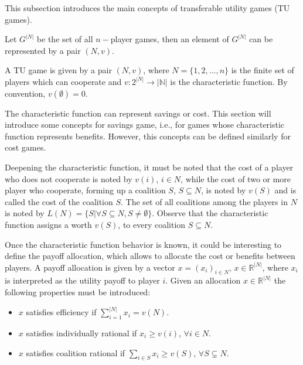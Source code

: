 This subsection introduces the main concepts of transferable utility games (TU games).

Let $G^{|N|}$ be the set of all $n-$player games, then an element of $G^{|N|}$ can be represented by a pair $(N,v)$. 


\begin{definition}
	A TU game is given by a pair $(N,v)$, where $N=\{1,2, \dots, n\}$ is the finite set of players which can cooperate and $v:2^{|N|} \rightarrow \mathbb{|N|}$ is the characteristic function. By convention, $v(\emptyset) = 0$.
\end{definition}
The characteristic function can represent savings or cost. This section will introduce some concepts for savings game, i.e., for games whose characteristic function represents benefits. However, this concepts can be defined similarly for cost games.

Deepening the characteristic function, it must be noted that the cost of a player who does not cooperate is noted by $v(i)$, $i \in N$, while the cost of two or more player who cooperate, forming up a coalition $S$, $S \subseteq N$, is noted by $v(S)$ and is called the cost of the coalition $S$. The set of all coalitions among the players in $N$ is noted by $L(N) = \{ S | \forall S \subseteq N, S \ne \emptyset \} $. Observe that the characteristic function assigns a worth $v(S)$, to every coalition $S \subseteq N$.


Once the characteristic function behavior is known, it could be interesting to define the payoff allocation, which allows to allocate the cost or benefits between players. A payoff allocation is given by a vector $x=(x_{i})_{i \in N}$, $x  \in \mathbb{R}^{|N|}$, where $x_{i}$ is interpreted as the utility payoff to player $i$. Given an allocation $x \in \mathbb{R}^{|N|}$ the following properties must be introduced:
\begin{itemize}
	\item $x$ satisfies efficiency if $\sum_{i = 1}^{|N|} x_{i}   = v(N)$.
	\item $x$ satisfies individually rational if $x_{i} \geq v(i)$, $\forall i \in N$.
	\item $x$ satisfies coalition rational if $\sum_{i \in S}x_{i} \geq v(S)$, $\forall S \subsetneq N$.
\end{itemize}



